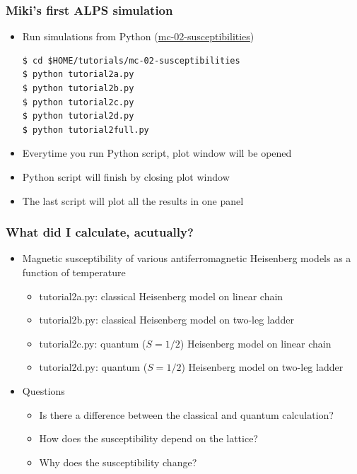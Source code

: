\begin{frame}[t,fragile]
  \frametitle{Miki's first ALPS simulation}
  \begin{itemize}
    \item Run simulations from Python (\href{http://alps.comp-phys.org/mediawiki/index.php/ALPS_2_Tutorials:MC-02_Susceptibilities}{mc-02-susceptibilities})
\begin{lstlisting}
$ cd $HOME/tutorials/mc-02-susceptibilities
$ python tutorial2a.py
$ python tutorial2b.py
$ python tutorial2c.py
$ python tutorial2d.py
$ python tutorial2full.py
\end{lstlisting}
    \item Everytime you run Python script, plot window will be opened
    \item Python script will finish by closing plot window
    \item The last script will plot all the results in one panel
  \end{itemize}
\end{frame}

\begin{frame}[t,fragile]
  \frametitle{What did I calculate, acutually?}
  \begin{itemize}
  \item Magnetic susceptibility of various antiferromagnetic Heisenberg models as a function of temperature
    \begin{itemize}
    \item tutorial2a.py: classical Heisenberg model on linear chain
    \item tutorial2b.py: classical Heisenberg model on two-leg ladder
    \item tutorial2c.py: quantum ($S=1/2$) Heisenberg model on linear chain
    \item tutorial2d.py: quantum ($S=1/2$) Heisenberg model on two-leg ladder
    \end{itemize}
  \item Questions
    \begin{itemize}
      \item Is there a difference between the classical and quantum calculation?
      \item How does the susceptibility depend on the lattice?
      \item Why does the susceptibility change?
    \end{itemize}
  \end{itemize}
\end{frame}

